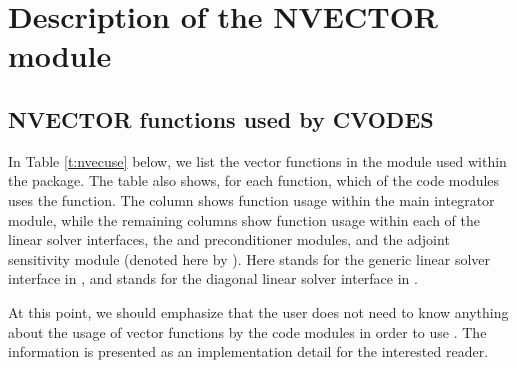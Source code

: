 \chapter{Description of the NVECTOR module}\label{s:nvector}



\section{NVECTOR functions used by CVODES}

In Table \ref{t:nvecuse} below, we list the vector functions in the
{\nvector} module used within the {\cvodes} package.
The table also shows, for each function, which of the code modules uses
the function. The {\cvodes} column shows function usage within the main
integrator module, while the remaining columns show function usage
within each of the {\cvodes} linear solver interfaces, the {\cvbandpre} and
{\cvbbdpre} preconditioner modules, and the {\cvodes} adjoint sensitivity
module (denoted here by {\cvodea}).  Here
{\cvls} stands for the generic linear solver interface in {\cvodes},
and {\cvdiag} stands for the diagonal linear solver interface in {\cvodes}.

At this point, we should emphasize that the {\cvodes} user does not need to know
anything about the usage of vector functions by the {\cvodes} code modules in order
to use {\cvodes}. The information is presented as an implementation detail for the
interested reader.

